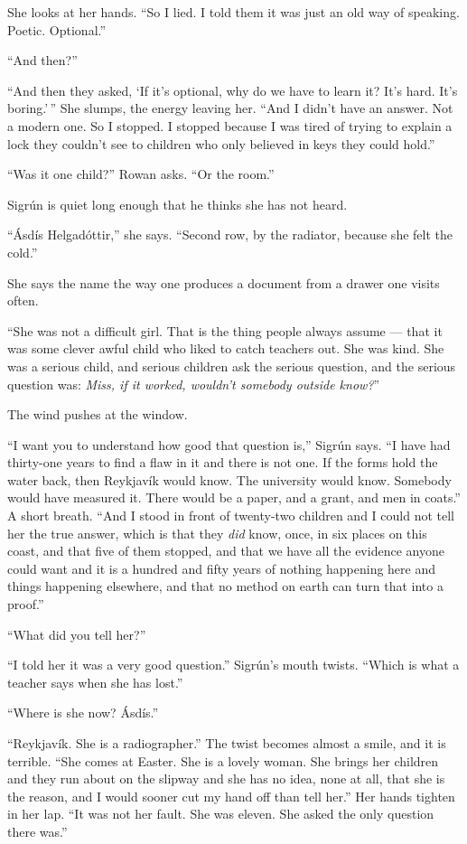 \documentclass[11pt,oneside]{book}
\begin{document}
She looks at her hands. ``So I lied. I told them it was just an old way
of speaking. Poetic. Optional.''

``And then?''

``And then they asked, `If it's optional, why do we have to learn it?
It's hard. It's boring.'\,'' She slumps, the energy leaving her. ``And I
didn't have an answer. Not a modern one. So I stopped. I stopped because
I was tired of trying to explain a lock they couldn't see to children
who only believed in keys they could hold.''

``Was it one child?'' Rowan asks. ``Or the room.''

Sigrún is quiet long enough that he thinks she has not heard.

``Ásdís Helgadóttir,'' she says. ``Second row, by the radiator, because
she felt the cold.''

She says the name the way one produces a document from a drawer one
visits often.

``She was not a difficult girl. That is the thing people always assume
--- that it was some clever awful child who liked to catch teachers out.
She was kind. She was a serious child, and serious children ask the
serious question, and the serious question was: \emph{Miss, if it worked,
wouldn't somebody outside know?}''

The wind pushes at the window.

``I want you to understand how good that question is,'' Sigrún says. ``I
have had thirty-one years to find a flaw in it and there is not one. If
the forms hold the water back, then Reykjavík would know. The university
would know. Somebody would have measured it. There would be a paper, and
a grant, and men in coats.'' A short breath. ``And I stood in front of
twenty-two children and I could not tell her the true answer, which is
that they \emph{did} know, once, in six places on this coast, and that
five of them stopped, and that we have all the evidence anyone could
want and it is a hundred and fifty years of nothing happening here and
things happening elsewhere, and that no method on earth can turn that
into a proof.''

``What did you tell her?''

``I told her it was a very good question.'' Sigrún's mouth twists.
``Which is what a teacher says when she has lost.''

``Where is she now? Ásdís.''

``Reykjavík. She is a radiographer.'' The twist becomes almost a smile,
and it is terrible. ``She comes at Easter. She is a lovely woman. She
brings her children and they run about on the slipway and she has no
idea, none at all, that she is the reason, and I would sooner cut my
hand off than tell her.'' Her hands tighten in her lap. ``It was not her
fault. She was eleven. She asked the only question there was.''
\end{document}
